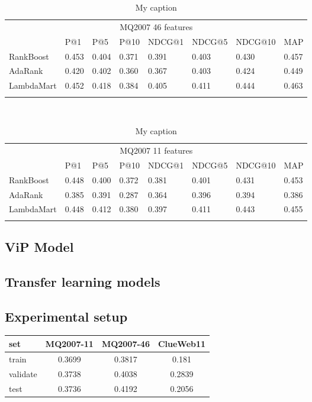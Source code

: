 \begin{table}[t]
\label{tab:11vs46}
\begin{tabular}{llllllll}
\multicolumn{8}{c}{MQ2007 46 features}                                     \\
           & P@1    & P@5    & P@10   & NDCG@1 & NDCG@5 & NDCG@10 & MAP    \\ \hline
RankBoost  & 0.453 & 0.404 & 0.371 & 0.391 & 0.403 & 0.430  & 0.457 \\
AdaRank    & 0.420 & 0.402 & 0.360 & 0.367 & 0.403 & 0.424  & 0.449 \\
LambdaMart & 0.452 & 0.418 & 0.384 & 0.405 & 0.411 & 0.444  & 0.463 \\
\hline
\\
\end{tabular}
\\
\begin{tabular}{llllllll}
\multicolumn{8}{c}{MQ2007 11 features}                                 \\
           & P@1   & P@5   & P@10  & NDCG@1 & NDCG@5 & NDCG@10 & MAP   \\ \hline
RankBoost  & 0.448 & 0.400 & 0.372 & 0.381  & 0.401  & 0.431   & 0.453 \\
AdaRank    & 0.385 & 0.391 & 0.287 & 0.364  & 0.396  & 0.394   & 0.386 \\
LambdaMart & 0.448 & 0.412 & 0.380 & 0.397  & 0.411  & 0.443   & 0.455 \\
\hline
\\
\end{tabular}
\centering
\caption{My caption}
\end{table}


\subsection{ViP Model}


\subsection{Transfer learning models}


\subsection{Experimental setup}
\begin{center}
  \begin{tabular}{ l | c | c | c}
    set & MQ2007-11 & MQ2007-46 & ClueWeb11  \\
    \hline
    train & 0.3699 & 0.3817 & 0.181 \\
    validate & 0.3738 & 0.4038 & 0.2839\\
    test & 0.3736 & 0.4192 & 0.2056\\
    \hline
  \end{tabular}
   \label{tab:countsscoure} 
\end{center}

